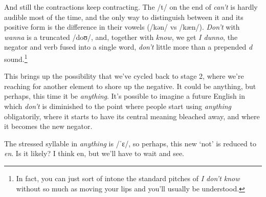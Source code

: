 And still the contractions keep contracting. The /t/ on the end of \textit{can't} is hardly audible most of the time, and the only way to distinguish between it and its positive form is the difference in their vowels (/kən/ vs /kæn/). \textit{Don't} with \textit{wanna} is a truncated /doʊ/, and, together with \textit{know}, we get \textit{I dunno}, the negator and verb fused into a single word, \textit{don't} little more than a prepended \textit{d} sound.\footnote{In fact, you can just sort of intone the standard pitches of \textit{I don't know} without so much as moving your lips and you'll usually be understood.}

This brings up the possibility that we've cycled back to stage 2, where we're reaching for another element to shore up the negative. It could be anything, but perhaps, this time it  be \textit{anything}. It's possible to imagine a future English in which \textit{don't} is diminished to the point where people start using \textit{anything} obligatorily, where it starts to have its central meaning bleached away, and where it becomes the new negator.

The stressed syllable in \textit{anything} is /ˈɛ/, so perhaps, this new `not' is reduced to \textit{en}. Is it likely? I think en, but we'll have to wait and see.






